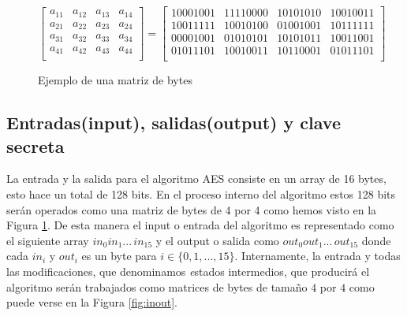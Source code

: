 \begin{figure}
\begin{figurebox}
\begin{center}
$
\left[
\begin{array}{cccc}
a_{11} & a_{12} & a_{13} & a_{14}\\
a_{21} & a_{22} & a_{23} & a_{24}\\
a_{31} & a_{32} & a_{33} & a_{34}\\
a_{41} & a_{42} & a_{43} & a_{44}\\
\end{array}
\right]=\left[
\begin{array}{c|c|c|c}
10001001 & 11110000 & 10101010 & 10010011\\\hline
10011111 & 10010100 & 01001001 & 10111111\\\hline
00001001 & 01010101 & 10101011 & 10011001\\\hline
01011101 & 10010011 & 10110001 & 01011101\\
\end{array}
\right]
$
\end{center}\caption{Ejemplo de una matriz de bytes}\label{fig:matrizbytes}
\end{figurebox}
\end{figure}



\subsection{Entradas(input), salidas(output) y clave secreta}\label{ss:input}

La entrada y la salida para el algoritmo AES consiste en un array de 16 bytes, esto hace un total de 128 bits. En el proceso interno del algoritmo estos 128 bits serán operados como una matriz de bytes de 4 por 4 como hemos visto en la Figura \ref{fig:matrizbytes}. De esta manera el input o entrada del algoritmo es representado como el siguiente array  $in_{0}in_{1}...\,in_{15}$  y el output o salida como $out_{0}out_{1}...\,out_{15}$ donde cada $in_{i}$ y  $out_{i}$ es un byte para $i \in \{0,1,...,15\}$. Internamente, la entrada y todas las modificaciones, que denominamos {\textsl estados intermedios},  que producirá el algoritmo serán trabajados como matrices de bytes de tamaño $4$ por $4$ como puede verse en la Figura \ref{fig:inout}.

